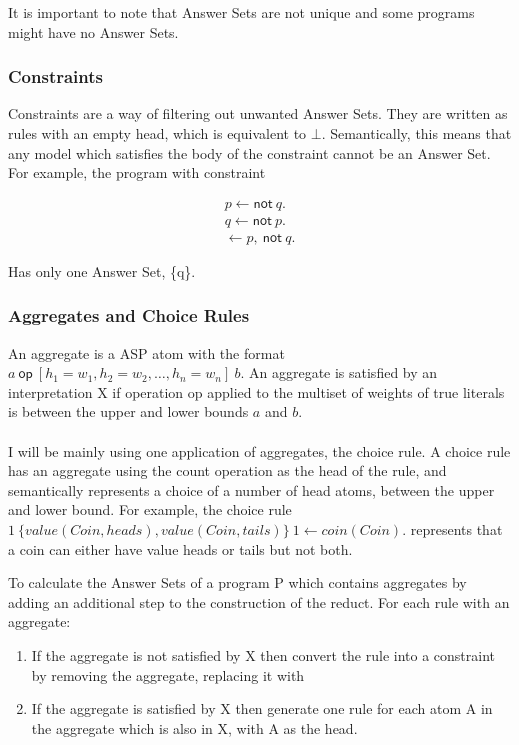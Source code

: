 It is important to note that Answer Sets are not unique and some programs might have no Answer Sets.

\subsubsection{Constraints}

Constraints are a way of filtering out unwanted Answer Sets. They are written as rules with an empty head, which is equivalent to $\bot$. Semantically, this means that any model which satisfies the body of the constraint cannot be an Answer Set. For example, the program with constraint

\begin{align*}
p \gets \textsf{not} \: q. \\
q \gets \textsf{not} \: p. \\
\gets p, \: \textsf{not} \: q.
\end{align*}

Has only one Answer Set, \{q\}.

\subsubsection{Aggregates and Choice Rules}

An aggregate is a ASP atom with the format $a \: \textsf{op} \: [h_1=w_1, h_2=w_2, \dots, h_n=w_n 	] \: b$. An aggregate is satisfied by an interpretation X if operation op applied to the multiset of weights of true literals is between the upper and lower bounds $a$ and $b$. \\ \\

I will be mainly using one application of aggregates, the choice rule. A choice rule has an aggregate using the count operation as the head of the rule, and semantically represents a choice of a number of head atoms, between the upper and lower bound. For example, the choice rule $1 \: \{ value(Coin, heads), value(Coin, tails)\} \: 1 \gets coin(Coin).$ represents that a coin can either have value heads or tails but not both.

To calculate the Answer Sets of a program P which contains aggregates by adding an additional step to the construction of the reduct. For each rule with an aggregate:

\begin{enumerate}
\item If the aggregate is not satisfied by X then convert the rule into a constraint by removing the aggregate, replacing it with %
\item If the aggregate is satisfied by X then generate one rule for each atom A in the aggregate which is also in X, with A as the head.
\end{enumerate}

